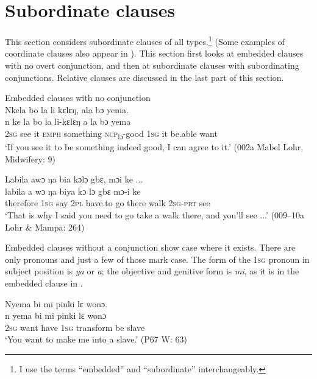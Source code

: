 \section{Subordinate clauses}
\label{sec:9.3}\hypertarget{Toc115517822}{}
This section considers subordinate clauses of all types.\footnote{I use the terms “embedded” and “subordinate” interchangeably.} (Some examples of coordinate clauses also appear in ). This section first looks at embedded clauses with no overt conjunction, and then at subordinate clauses with subordinating conjunctions. Relative clauses are discussed in the last part of this section.

\ea%
    \label{ex:232}
    Embedded clauses with no conjunction\\
    \ea Nkela bo la li kɛlɛŋ, ala bɔ yema.\\
    \gll n    ke    la  bo      la        li-kɛlɛŋ    a    la  bɔ      yema\\
    \textsc{2sg}  see  it  \textsc{emph}    something  \textsc{ncp}\textsubscript{lɔ}{}-good  \textsc{1sg}  it  be.able  want\\
    \glt ‘If you see it to be something indeed good, I can agree to it.' (002a Mabel Lohr, Midwifery: 9)

    \ex Labila awɔ ŋa bia kɔlɔ gbɛ, mɔi ke ...\\
    \gll labila      a    wɔ    ŋa    biya    kɔ    lɔ    gbɛ    mɔ-i    ke\\
    therefore    1\textsc{sg}  say  2\textsc{pl}  have.to  go    there  walk    2\textsc{sg-prt}  see\\
    \glt ‘That is why I said you need to go take a walk there, and you'll see ...' (009--10a Lohr \& Mampa: 264)
\z
\z

Embedded clauses without a conjunction show case where it exists. There are only pronouns and just a few of those mark case. The form of the \textsc{1sg} pronoun in subject position is \textit{ya} or \textit{a}; the objective and genitive form is \textit{mi}, as it is in the embedded clause in .

\ea%
    \label{ex:233}
    Nyema bi mi pinki lɛ wonɔ.\\
    \gll n    yema    bi    mi    pinki      lɛ    wonɔ\\
    \textsc{2sg}  want    have  \textsc{1sg}  transform  be    slave\\
    \glt ‘You want to make me into a slave.' (P67 W: 63)
\z

